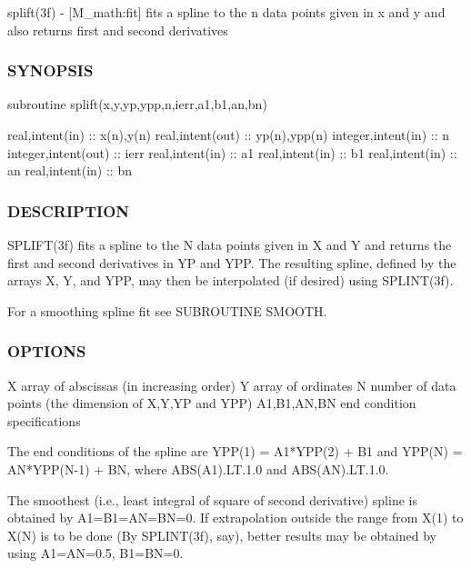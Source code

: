 splift(3f) -\/ \mbox{[}M\+\_\+math\+:fit\mbox{]} fits a spline to the n data points given in x and y and also returns first and second derivatives \subsubsection*{S\+Y\+N\+O\+P\+S\+IS}

subroutine splift(x,y,yp,ypp,n,ierr,a1,b1,an,bn)

real,intent(in) \+:\+: x(n),y(n) real,intent(out) \+:\+: yp(n),ypp(n) integer,intent(in) \+:\+: n integer,intent(out) \+:\+: ierr real,intent(in) \+:\+: a1 real,intent(in) \+:\+: b1 real,intent(in) \+:\+: an real,intent(in) \+:\+: bn

\subsubsection*{D\+E\+S\+C\+R\+I\+P\+T\+I\+ON}

S\+P\+L\+I\+F\+T(3f) fits a spline to the N data points given in X and Y and returns the first and second derivatives in YP and Y\+PP. The resulting spline, defined by the arrays X, Y, and Y\+PP, may then be interpolated (if desired) using S\+P\+L\+I\+N\+T(3f).

For a smoothing spline fit see S\+U\+B\+R\+O\+U\+T\+I\+NE S\+M\+O\+O\+TH. \subsubsection*{O\+P\+T\+I\+O\+NS}

\begin{DoxyVerb}   X            array of abscissas (in increasing order)
   Y            array of ordinates
   N            number of data points (the dimension of X,Y,YP and YPP)
   A1,B1,AN,BN  end condition specifications

                 The end conditions of the spline are
                      YPP(1) = A1*YPP(2) + B1
                 and
                      YPP(N) = AN*YPP(N-1) + BN,
                 where
                      ABS(A1).LT.1.0 and ABS(AN).LT.1.0.

         The smoothest (i.e., least integral of square of
         second derivative) spline is obtained by A1=B1=AN=BN=0.
         If extrapolation outside the range from X(1) to X(N)
         is to be done (By SPLINT(3f), say), better results may
         be obtained by using A1=AN=0.5, B1=BN=0.
\end{DoxyVerb}


